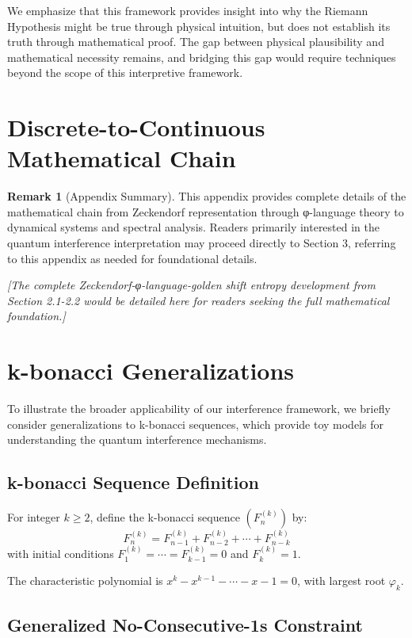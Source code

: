 \documentclass[12pt]{article}
\theoremstyle{plain}
\theoremstyle{definition}
\newtheorem{remark}[theorem]{Remark}
\begin{document}
We emphasize that this framework provides insight into why the Riemann Hypothesis might be true through physical intuition, but does not establish its truth through mathematical proof. The gap between physical plausibility and mathematical necessity remains, and bridging this gap would require techniques beyond the scope of this interpretive framework.

\appendix

\section{Discrete-to-Continuous Mathematical Chain}

\begin{remark}[Appendix Summary]
This appendix provides complete details of the mathematical chain from Zeckendorf representation through φ-language theory to dynamical systems and spectral analysis. Readers primarily interested in the quantum interference interpretation may proceed directly to Section 3, referring to this appendix as needed for foundational details.
\end{remark}

\textit{[The complete Zeckendorf-φ-language-golden shift entropy development from Section 2.1-2.2 would be detailed here for readers seeking the full mathematical foundation.]}

\section{k-bonacci Generalizations}

To illustrate the broader applicability of our interference framework, we briefly consider generalizations to k-bonacci sequences, which provide toy models for understanding the quantum interference mechanisms.

\subsection{k-bonacci Sequence Definition}

For integer $k \geq 2$, define the k-bonacci sequence $(F_n^{(k)})$ by:
$$
F_n^{(k)} = F_{n-1}^{(k)} + F_{n-2}^{(k)} + \cdots + F_{n-k}^{(k)}
$$
with initial conditions $F_1^{(k)} = \cdots = F_{k-1}^{(k)} = 0$ and $F_k^{(k)} = 1$.

The characteristic polynomial is $x^k - x^{k-1} - \cdots - x - 1 = 0$, with largest root $\varphi_k$.

\subsection{Generalized No-Consecutive-1s Constraint}
\end{document}
